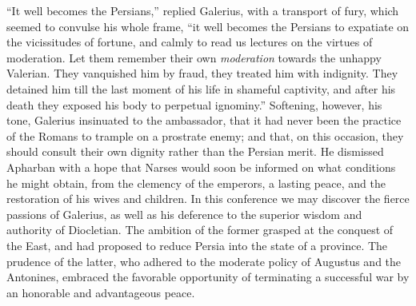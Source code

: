 “It well becomes the Persians,” replied Galerius, with a
transport of fury, which seemed to convulse his whole frame, “it
well becomes the Persians to expatiate on the vicissitudes of
fortune, and calmly to read us lectures on the virtues of
moderation. Let them remember their own \textit{moderation} towards the
unhappy Valerian. They vanquished him by fraud, they treated him
with indignity. They detained him till the last moment of his
life in shameful captivity, and after his death they exposed his
body to perpetual ignominy.” Softening, however, his tone,
Galerius insinuated to the ambassador, that it had never been the
practice of the Romans to trample on a prostrate enemy; and that,
on this occasion, they should consult their own dignity rather
than the Persian merit. He dismissed Apharban with a hope that
Narses would soon be informed on what conditions he might obtain,
from the clemency of the emperors, a lasting peace, and the
restoration of his wives and children. In this conference we may
discover the fierce passions of Galerius, as well as his
deference to the superior wisdom and authority of Diocletian. The
ambition of the former grasped at the conquest of the East, and
had proposed to reduce Persia into the state of a province. The
prudence of the latter, who adhered to the moderate policy of
Augustus and the Antonines, embraced the favorable opportunity of
terminating a successful war by an honorable and advantageous
peace.\footnotemark[75]


